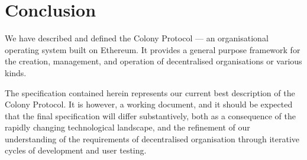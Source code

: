 \section{Conclusion}\label{sec:conclusion}\label{sec:conclusion}

We have described and defined the Colony Protocol --- an organisational operating system built on Ethereum. It provides a general purpose framework for the creation, management, and operation of decentralised organisations or various kinds.

The specification contained herein represents our current best description of the Colony Protocol. It is however, a working document, and it should be expected that the final specification will differ substantively, both as a consequence of the rapidly changing technological landscape, and the refinement of our understanding of the requirements of decentralised organisation through iterative cycles of development and user testing.